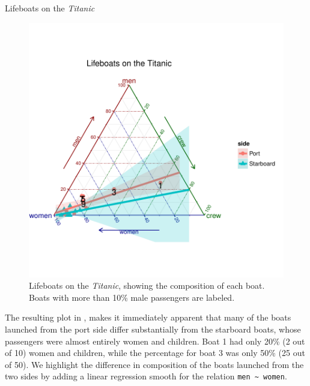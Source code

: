 \documentclass[10pt,krantz2]{krantz}\usepackage[]{graphicx}\usepackage[]{color}
\newenvironment{knitrout}{}{} %
\renewenvironment{knitrout}{\small\renewcommand{\baselinestretch}{.85}}{} %
\begin{document}
\begin{Example}[lifeboat1]{Lifeboats on the \emph{Titanic}}
\begin{knitrout}
\begin{figure}[!htbp]
\centerline{\includegraphics[width=.7\textwidth,clip,trim=0 80 0 80]{ch04/fig/lifeboats1-1} }

\caption[Lifeboats on the Titanic]{Lifeboats on the \emph{Titanic}, showing the composition of each boat.  Boats with more than 10\% male passengers are labeled.\label{fig:lifeboats1}}
\end{figure}


\end{knitrout}
The resulting plot in , makes it immediately apparent
that many of the boats launched from the port side differ substantially
from the starboard boats, whose passengers were almost entirely women
and children.  Boat 1 had only 20\% (2 out of 10) women and children, while the percentage for boat 3 was only 50\% (25 out of 50). We highlight the difference in
composition of the boats launched from the two sides by adding a linear regression
smooth for the relation \verb|men ~ women|.


\end{Example}
\end{document}
